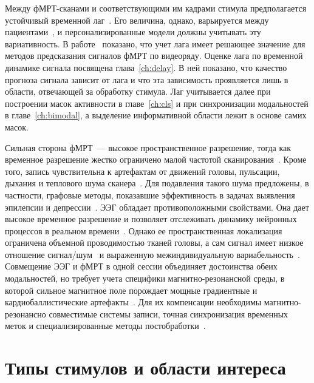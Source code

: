 Между фМРТ-сканами и соответствующими им кадрами стимула предполагается устойчивый временной лаг~\cite{Logothetis2003}. Его величина, однако, варьируется между пациентами~\cite{handwerker2004variation, handwerker2012continuing}, и персонализированные модели должны учитывать эту вариативность. В работе~\cite{dorin2024forecasting} показано, что учет лага имеет решающее значение для методов предсказания сигналов фМРТ по видеоряду. Оценке лага по временной динамике сигнала посвящена глава~\ref{ch:delay}. В ней показано, что качество прогноза сигнала зависит от лага и что эта зависимость проявляется лишь в области, отвечающей за обработку стимула. Лаг учитывается далее при построении масок активности в главе~\ref{ch:cls} и при синхронизации модальностей в главе~\ref{ch:bimodal}, а выделение информативной области лежит в основе самих масок.

Сильная сторона фМРТ~--- высокое пространственное разрешение, тогда как временное разрешение жестко ограничено малой частотой сканирования~\cite{Glover2011, menon1999spatial, logothetis2008we}. Кроме того, запись чувствительна к артефактам от движений головы, пульсации, дыхания и теплового шума сканера~\cite{menon1999spatial, logothetis2008we}. Для подавления такого шума предложены, в частности, графовые методы, показавшие эффективность в задачах выявления эпилепсии и депрессии~\cite{1804.10167}. ЭЭГ обладает противоположными свойствами. Она дает высокое временное разрешение и позволяет отслеживать динамику нейронных процессов в реальном времени~\cite{burle2015spatial}. Однако ее пространственная локализация ограничена объемной проводимостью тканей головы, а сам сигнал имеет низкое отношение сигнал/шум~\cite{signal_to_noise_eeg} и выраженную межиндивидуальную вариабельность~\cite{morioka2015learning, jayaram2016transfer}. Совмещение ЭЭГ и фМРТ в одной сессии объединяет достоинства обеих модальностей, но требует учета специфики магнитно-резонансной среды, в которой сильное магнитное поле порождает мощные градиентные и кардиобаллистические артефакты~\cite{ritter2006simultaneous, niazy2005removal}. Для их компенсации необходимы магнитно-резонансно совместимые системы записи, точная синхронизация временных меток и специализированные методы постобработки~\cite{huster2012methods}.

\section{Типы стимулов и области интереса}\label{sec1:roi}

